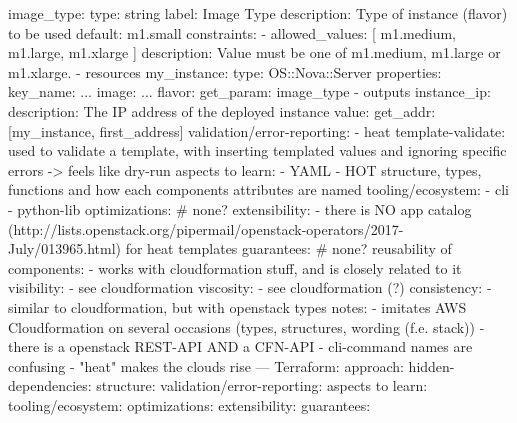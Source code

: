         image\_type:
          type: string %
          label: Image Type
          description: Type of instance (flavor) to be used
          default: m1.small %
          constraints:
            - allowed\_values: [ m1.medium, m1.large, m1.xlarge ]
              description: Value must be one of m1.medium, m1.large or m1.xlarge.
    - resources %
        my\_instance:
          type: OS::Nova::Server
          properties:
            key\_name: ...
            image: ...
            flavor: { get\_param: image\_type }
    - outputs
        instance\_ip:
          description: The IP address of the deployed instance
          value: { get\_addr: [my\_instance, first\_address] } %
  validation/error-reporting:
    - heat template-validate: used to validate a template, with inserting templated values and ignoring specific errors -> feels like dry-run
  aspects to learn:
    - YAML
    - HOT structure, types, functions and how each components attributes are named
  tooling/ecosystem:
    - cli
    - python-lib
  optimizations: # none?
  extensibility:
    - there is NO app catalog (http://lists.openstack.org/pipermail/openstack-operators/2017-July/013965.html) for heat templates
  guarantees: # none?
  reusability of components:
    - works with cloudformation stuff, and is closely related to it
  visibility:
    - see cloudformation
  viscosity:
    - see cloudformation (?)
  consistency:
    - similar to cloudformation, but with openstack types
  notes:
    - imitates AWS Cloudformation on several occasions (types, structures, wording (f.e. stack))
    - there is a openstack REST-API AND a CFN-API
    - cli-command names are confusing
    - "heat" makes the clouds rise
---
Terraform:
  approach:
  hidden-dependencies:
  structure:
  validation/error-reporting:
  aspects to learn:
  tooling/ecosystem:
  optimizations:
  extensibility:
  guarantees:
